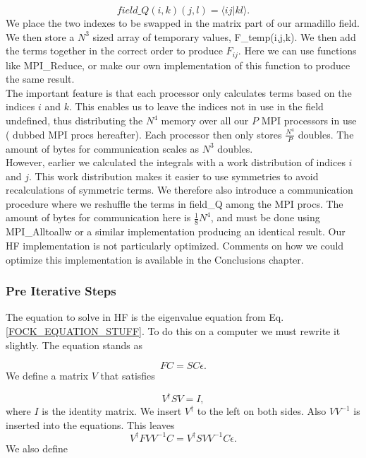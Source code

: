 \documentclass[a4paper,norsk,11pt,twoside]{report}
\begin{document}
\begin{equation}
field\_Q(i,k)(j,l) = \langle i j | k l \rangle .
\end{equation}
We place the two indexes to be swapped in the matrix part of our armadillo field. We then store a $N^3$ sized array of temporary values, F\_temp(i,j,k). We then add the terms together in the correct order to produce $F_{ij}$. Here we can use functions like MPI\_Reduce, or make our own implementation of this function to produce the same result. \\

The important feature is that each processor only calculates terms
based on the indices $i$ and $k$. This enables us to leave the indices not
in use in the field undefined, thus distributing the $N^4$ memory over
all our $P$ MPI processors in use ( dubbed MPI procs hereafter). Each processor then only
stores $\frac{N^4}{P}$ doubles. The amount of bytes for communication
scales as $N^3$ doubles. \\

However, earlier we calculated the integrals with a work distribution
of indices $i$ and $j$. This work distribution makes it easier to use
symmetries to avoid recalculations of symmetric terms. We therefore
also introduce a communication procedure where we reshuffle the terms
in field\_Q among the MPI procs. The amount of bytes for communication
here is $\frac{1}{8} N^4$, and must be done using MPI\_Alltoallw or a
similar implementation producing an identical result. Our HF
implementation is not particularly optimized. Comments on how we could
optimize this implementation is available in the Conclusions chapter.

\subsubsection{Pre Iterative Steps}
The equation to solve in HF is the eigenvalue equation from
Eq. \eqref{FOCK_EQUATION_STUFF}. To do this on a computer we must
rewrite it slightly. The equation stands as

\begin{equation}
F C = S C \epsilon . \label{fdsaghbxcxd}
\end{equation}
We define a matrix $V$ that satisfies

\begin{equation}
V^{\dag} S V = I , \label{fdsafafdsafdsafa}
\end{equation}
where $I$ is the identity matrix. We insert $V^{\dag}$ to the left on both sides. Also $V V^{-1} $ is inserted into the equations. This leaves
\begin{equation}
V^{\dag} F V V^{-1} C = V^{\dag} S V V^{-1} C \epsilon .
\end{equation}
We also define 
\end{document}

